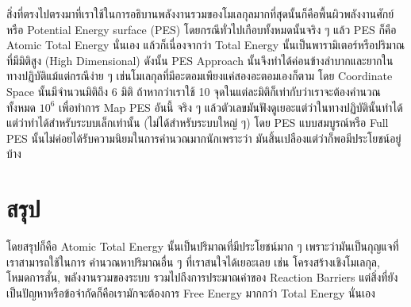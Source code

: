 สิ่งที่ตรงไปตรงมาที่เราใช้ในการอธิบานพลังงานรวมของโมเลกุลมากที่สุดนั้นก็คือพื้นผิวพลังงานศักย์หรือ Potential Energy 
surface (PES) โดยกรณีทั่วไปเกือบทั้งหมดนั้นจริง ๆ แล้ว PES ก็คือ Atomic Total Energy นั่นเอง 
แล้วก็เนื่องจากว่า Total Energy นั้นเป็นพารามิเตอร์หรือปริมาณที่มีมิติสูง (High Dimensional) ดังนั้น PES Approach 
นั้นจึงทำได้ค่อนข้างลำบากและยากในทางปฏิบัติแม้แต่กรณีง่าย ๆ เช่นโมเลกุลที่มีอะตอมเพียงแค่สองอะตอมเองก็ตาม 
โดย Coordinate Space นั้นมีจำนวนมิติถึง 6 มิติ ถ้าหากว่าเราใช้ 10 จุดในแต่ละมิติก็เท่ากับว่าเราจะต้องคำนวณทั้งหมด 
$10^{6}$ เพื่อทำการ Map PES อันนี้ จริง ๆ แล้วตัวเลขมันฟังดูเยอะแต่ว่าในทางปฏิบัตินั้นทำได้แต่ว่าทำได้สำหรับระบบเล็กเท่านั้น 
(ไม่ได้สำหรับระบบใหญ่ ๆ) โดย PES แบบสมบูรณ์หรือ Full PES นั้นไม่ค่อยได้รับความนิยมในการคำนวณมากนักเพราะว่า%
มันสิ้นเปลืองแต่ว่าก็พอมีประโยชน์อยู่บ้าง

\section{สรุป}

โดยสรุปก็คือ Atomic Total Energy นั้นเป็นปริมาณที่มีประโยชน์มาก ๆ เพราะว่ามันเป็นกุญแจที่เราสามารถใช้ในการ%
คำนวณหาปริมาณอื่น ๆ ที่เราสนใจได้เยอะเลย เช่น โครงสร้างเชิงโมเลกุล, โหมดการสั่น, พลังงานรวมของระบบ 
รวมไปถึงการประมาณค่าของ Reaction Barriers แต่สิ่งที่ยังเป็นปัญหาหรือข้อจำกัดก็คือเรามักจะต้องการ Free Energy 
มากกว่า Total Energy นั่นเอง 
